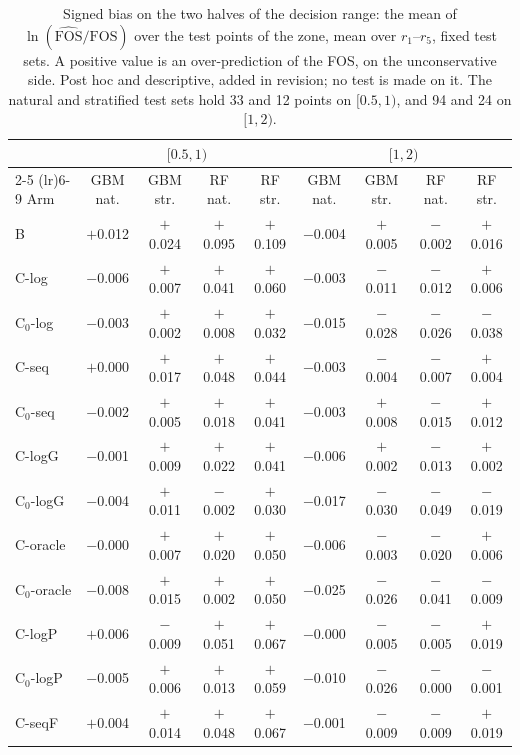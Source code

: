 \begin{table}[htbp]
\centering
\footnotesize
\setlength{\tabcolsep}{2.5pt}
\caption{Signed bias on the two halves of the decision range: the mean of $\ln(\widehat{\mathrm{FOS}}/\mathrm{FOS})$ over the test points of the zone, mean over $r_1$--$r_5$, fixed test sets. A positive value is an over-prediction of the FOS, on the unconservative side. Post hoc and descriptive, added in revision; no test is made on it. The natural and stratified test sets hold 33 and 12 points on $[0.5, 1)$, and 94 and 24 on $[1, 2)$.}
\label{tab:rev:bias}
\begin{tabular}{lcccc|cccc}
\toprule
 & \multicolumn{4}{c|}{$[0.5, 1)$} & \multicolumn{4}{c}{$[1, 2)$} \\
\cmidrule(lr){2-5} \cmidrule(lr){6-9}
Arm & GBM nat. & GBM str. & RF nat. & RF str. & GBM nat. & GBM str. & RF nat. & RF str. \\
\midrule
B & $+$0.012 & $+$0.024 & $+$0.095 & $+$0.109 & $-$0.004 & $+$0.005 & $-$0.002 & $+$0.016 \\
C-log & $-$0.006 & $+$0.007 & $+$0.041 & $+$0.060 & $-$0.003 & $-$0.011 & $-$0.012 & $+$0.006 \\
C$_0$-log & $-$0.003 & $+$0.002 & $+$0.008 & $+$0.032 & $-$0.015 & $-$0.028 & $-$0.026 & $-$0.038 \\
C-seq & $+$0.000 & $+$0.017 & $+$0.048 & $+$0.044 & $-$0.003 & $-$0.004 & $-$0.007 & $+$0.004 \\
C$_0$-seq & $-$0.002 & $+$0.005 & $+$0.018 & $+$0.041 & $-$0.003 & $+$0.008 & $-$0.015 & $+$0.012 \\
C-logG & $-$0.001 & $+$0.009 & $+$0.022 & $+$0.041 & $-$0.006 & $+$0.002 & $-$0.013 & $+$0.002 \\
C$_0$-logG & $-$0.004 & $+$0.011 & $-$0.002 & $+$0.030 & $-$0.017 & $-$0.030 & $-$0.049 & $-$0.019 \\
C-oracle & $-$0.000 & $+$0.007 & $+$0.020 & $+$0.050 & $-$0.006 & $-$0.003 & $-$0.020 & $+$0.006 \\
C$_0$-oracle & $-$0.008 & $+$0.015 & $+$0.002 & $+$0.050 & $-$0.025 & $-$0.026 & $-$0.041 & $-$0.009 \\
C-logP & $+$0.006 & $-$0.009 & $+$0.051 & $+$0.067 & $-$0.000 & $-$0.005 & $-$0.005 & $+$0.019 \\
C$_0$-logP & $-$0.005 & $+$0.006 & $+$0.013 & $+$0.059 & $-$0.010 & $-$0.026 & $-$0.000 & $-$0.001 \\
C-seqF & $+$0.004 & $+$0.014 & $+$0.048 & $+$0.067 & $-$0.001 & $-$0.009 & $-$0.009 & $+$0.019 \\

\end{tabular}
\end{table}
